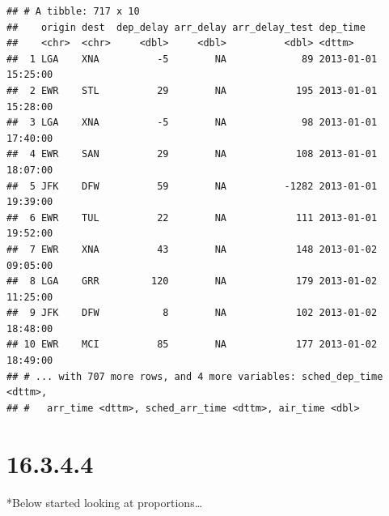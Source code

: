 \documentclass[]{book}
\theoremstyle{definition}
\theoremstyle{definition}
\theoremstyle{definition}
\theoremstyle{remark}
\begin{document}
\begin{verbatim}
## # A tibble: 717 x 10
##    origin dest  dep_delay arr_delay arr_delay_test dep_time           
##    <chr>  <chr>     <dbl>     <dbl>          <dbl> <dttm>             
##  1 LGA    XNA          -5        NA             89 2013-01-01 15:25:00
##  2 EWR    STL          29        NA            195 2013-01-01 15:28:00
##  3 LGA    XNA          -5        NA             98 2013-01-01 17:40:00
##  4 EWR    SAN          29        NA            108 2013-01-01 18:07:00
##  5 JFK    DFW          59        NA          -1282 2013-01-01 19:39:00
##  6 EWR    TUL          22        NA            111 2013-01-01 19:52:00
##  7 EWR    XNA          43        NA            148 2013-01-02 09:05:00
##  8 LGA    GRR         120        NA            179 2013-01-02 11:25:00
##  9 JFK    DFW           8        NA            102 2013-01-02 18:48:00
## 10 EWR    MCI          85        NA            177 2013-01-02 18:49:00
## # ... with 707 more rows, and 4 more variables: sched_dep_time <dttm>,
## #   arr_time <dttm>, sched_arr_time <dttm>, air_time <dbl>
\end{verbatim}

\hypertarget{section-61}{%
\section{16.3.4.4}\label{section-61}}

*Below started looking at proportions\ldots{}
\end{document}
